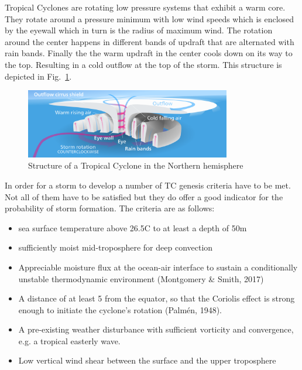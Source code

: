 Tropical Cyclones are rotating low pressure systems that exhibit a warm core. They rotate around a pressure minimum with low wind speeds which is enclosed by the eyewall which in turn is the radius of maximum wind. The rotation around the center happens in different bands of updraft that are alternated with rain bands. Finally the the warm updraft in the center cools down on its way to the top. Resulting in a cold outflow at the top of the storm. This structure is depicted in Fig.~\ref{fig:tc-structure}.
\begin{figure}[ht]
	\centering
	\includegraphics[width=0.8\textwidth]{img/hurricane-structure.png}
	\caption{Structure of a Tropical Cyclone in the Northern hemisphere~\cite{hurricane-structure}}
	\label{fig:tc-structure}
\end{figure}
In order for a storm to develop a number of TC genesis criteria have to be met. Not all of them have to be satisfied but they do offer a good indicator for the probability of storm formation.
The criteria are as follows:
\begin{itemize}
	\item sea surface temperature above 26.5\degree C to at least a depth of 50m
	\item sufficiently moist mid-troposphere for deep convection
	\item Appreciable moisture flux at the ocean-air interface to sustain a conditionally unstable thermodynamic environment (Montgomery \& Smith, 2017)
	\item A distance of at least 5 from the equator, so that the Coriolis effect is strong enough to initiate the cyclone's rotation (Palm\'{e}n, 1948).
	\item A pre-existing weather disturbance with sufficient vorticity and convergence, e.g. a tropical easterly wave.
	\item Low vertical wind shear between the surface and the upper troposphere
\end{itemize}
\cite{lohmann-storms}

